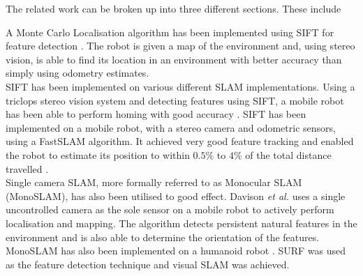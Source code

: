 \documentclass{report}
\begin{document}
The related work can be broken up into three different sections. These include 










A Monte Carlo Localisation algorithm has been implemented using SIFT for feature detection \cite{Gil}. The robot is given a map of the environment and, using stereo vision, is able to find its location in an environment with better accuracy than simply using odometry estimates.\\

SIFT has been implemented on various different SLAM implementations. Using a triclops stereo vision system and detecting features using SIFT, a mobile robot has been able to perform homing with good accuracy \cite{Se2001, Se2002}. SIFT has been implemented on a mobile robot, with a stereo camera and odometric sensors, using a FastSLAM algorithm. It achieved very good feature tracking and enabled the robot to estimate its position to within $0.5\%$ to $4\%$ of the total distance travelled \cite{Barfoot2005}.\\

Single camera SLAM, more formally referred to as Monocular SLAM (MonoSLAM), has also been utilised to good effect. Davison \textit{et al.} \cite{Davison2007} uses a single uncontrolled camera as the sole sensor on a mobile robot to actively perform localisation and mapping. The algorithm detects persistent natural features in the environment and is also able to determine the orientation of the features. MonoSLAM has also been implemented on a humanoid robot \cite{Wang2011}. SURF was used as the feature detection technique and visual SLAM was achieved.\\
\end{document}
